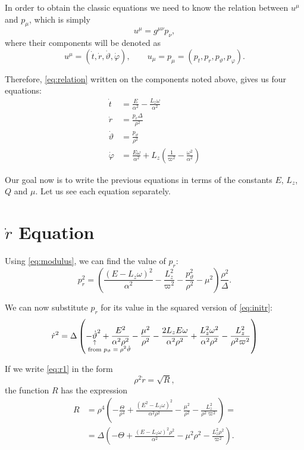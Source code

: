 In order to obtain the classic equations we need to know the relation between $u^\mu$ and $p_\mu$, which is simply
\begin{equation}
	\label{eq:relation}
	u^\mu = g^{\mu\nu}p_\nu,
\end{equation}
where their components will be denoted as
\[
	u^\mu = (\dot{t}, \dot{r}, \dot{\vartheta}, \dot{\varphi}), \qquad u_\mu = p_\mu = (p_t, p_r, p_\vartheta, p_\varphi).
\]

Therefore, \autoref{eq:relation} written on the components noted above, gives us four equations:
\begin{align}
	\label{eq:initt}
	\dot{t} &= \frac{E}{\alpha^2} - \frac{L_z \omega}{\alpha^2} \\
	\label{eq:initr}
	\dot{r} &= \frac{p_r \Delta}{\rho^2} \\
	\label{eq:inittheta}
	\dot{\vartheta} &= \frac{p_\vartheta}{\rho^2} \\
	\label{eq:initphi}
	\dot{\varphi} &= \frac{E \omega}{\alpha^2} + L_z\left( \frac{1}{\varpi^2} - \frac{\omega^2}{\alpha^2} \right)
\end{align}

Our goal now is to write the previous equations in terms of the constants $E$, $L_z$, $Q$ and $\mu$. Let us see each equation separately.

\section{$\dot{r}$ Equation}

Using \autoref{eq:modulus}, we can find the value of $p_r$:
\[
	p_r^2 = \left( \frac{(E - L_z\omega)^2}{\alpha^2} - \frac{L_z^2}{\varpi^2} - \frac{p_\vartheta^2}{\rho^2} - \mu^2 \right) \frac{\rho^2}{\Delta}.
\]

We can now substitute $p_r$ for its value in the squared version of \autoref{eq:initr}:
\begin{equation}
	\label{eq:r1}
	\dot{r}^2 = \Delta \left( -\eqnote{\dot{\vartheta}}{from $p_\vartheta = \rho^2\dot{\vartheta}$}^2 + \frac{E^2}{\alpha^2\rho^2} - \frac{\mu^2}{\rho^2} - \frac{2L_zE\omega}{\alpha^2\rho^2} + \frac{L_z^2\omega^2}{\alpha^2\rho^2} - \frac{L_z^2}{\rho^2\varpi^2} \right)
\end{equation}

If we write \autoref{eq:r1} in the form
\[
	\rho^2 \dot{r} = \sqrt{R},
\]
the function $R$ has the expression
\begin{align}
	\nonumber
	R &= \rho^4 \left( -\frac{\Theta}{\rho^4} + \frac{(E^2 - L_z\omega)^2}{\alpha^2\rho^2} - \frac{\mu^2}{\rho^2} - \frac{L_z^2}{\rho^2\varpi^2} \right) = \\
	&= \Delta \left( -\Theta + \frac{(E-L_z\omega)^2\rho^2}{\alpha^2} - \mu^2\rho^2 - \frac{L_z^2 \rho^2}{\varpi^2} \right).
	\label{eq:R1}
\end{align}

